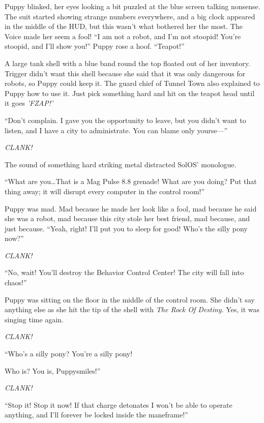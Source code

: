 Puppy blinked, her eyes looking a bit puzzled at the blue screen talking nonsense. The suit started showing strange numbers everywhere, and a big clock appeared in the middle of the HUD, but this wasn't what bothered her the most. The Voice made her seem a fool! ``I am not a robot, and I'm not stoopid! You're stoopid, and I'll show you!'' Puppy rose a hoof. ``Teapot!''

A large tank shell with a blue band round the top floated out of her inventory. Trigger didn't want this shell because she said that it was only dangerous for robots, so Puppy could keep it. The guard chief of Tunnel Town also explained to Puppy how to use it. Just pick something hard and hit on the teapot head until it goes \emph{'FZAP!'}

``Don't complain. I gave you the opportunity to leave, but you didn't want to listen, and I have a city to administrate. You can blame only yourse---''

\emph{CLANK!}

The sound of something hard striking metal distracted SolOS' monologue.

``What are you\dots That is a Mag Pulse 8.8 grenade! What are you doing? Put that thing away; it will disrupt every computer in the control room!''

Puppy was mad. Mad because he made her look like a fool, mad because he said she was a robot, mad because this city stole her best friend, mad because, and just because. ``Yeah, right! I'll put you to sleep for good! Who's the silly pony now?''

\emph{CLANK!}

``No, wait! You'll destroy the Behavior Control Center! The city will fall into chaos!''

Puppy was sitting on the floor in the middle of the control room. She didn't say anything else as she hit the tip of the shell with \emph{The Rock Of Destiny}. Yes, it was singing time again.

\emph{CLANK!}

\begin{song}
	``Who's a silly pony? You're a silly pony!
	
	Who is? You is, Puppysmiles!''
\end{song}

\emph{CLANK!}

``Stop it! Stop it now! If that charge detonates I won't be able to operate anything, and I'll forever be locked inside the maneframe!''


